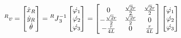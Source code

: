 \documentclass[11pt]{article}
\begin{document}
    \begin{equation}
        \label{eq:finalforward}
        \prescript{R}{}{v}=
        \begin{bmatrix}
            \dot{x}_{R} \\
            \dot{y}_{R} \\
            \dot{\theta} \\
        \end{bmatrix}
        = \prescript{R}{}{J}^{-1}_{3}
        \begin{bmatrix}
            \dot{\varphi_{1}} \\
            \dot{\varphi_{2}} \\
            \dot{\varphi_{3}} \\
        \end{bmatrix}
        =
        \begin{bmatrix}
            0 & \frac{\sqrt{2}r}{2} & \frac{\sqrt{2}r}{2} \\
            -\frac{\sqrt{2}r}{2} & \frac{\sqrt{2}r}{2} & 0 \\
            -\frac{r}{4L} & 0 & \frac{r}{4L} \\
        \end{bmatrix}
        \begin{bmatrix}
            \dot{\varphi_{1}} \\
            \dot{\varphi_{2}} \\
            \dot{\varphi_{3}} \\
        \end{bmatrix}
    \end{equation}
\end{document}

